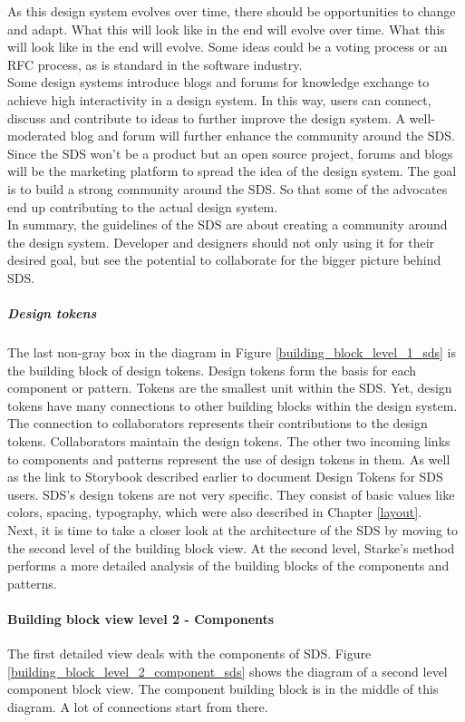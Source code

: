 As this design system evolves over time, there should be opportunities to change and adapt. What this will look like in the end will evolve over time. What this will look like in the end will evolve. Some ideas could be a voting process or an RFC process, as is standard in the software industry. \\
Some design systems introduce blogs and forums for knowledge exchange to achieve high interactivity in a design system. In this way, users can connect, discuss and contribute to ideas to further improve the design system. A well-moderated blog and forum will further enhance the community around the \ac{SDS}. \\
Since the \ac{SDS} won't be a product but an open source project, forums and blogs will be the marketing platform to spread the idea of the design system. The goal is to build a strong community around the \ac{SDS}. So that some of the advocates end up contributing to the actual design system. \\
In summary, the guidelines of the \acl{SDS} are about creating a community around the design system. Developer and designers should not only using it for their desired goal, but see the potential to collaborate for the bigger picture behind \ac{SDS}.

\subparagraph{Design tokens}
The last non-gray box in the diagram in Figure \ref{building_block_level_1_sds} is the building block of design tokens. Design tokens form the basis for each component or pattern. Tokens are the smallest unit within the \ac{SDS}. Yet, design tokens have many connections to other building blocks within the design system. 
The connection to collaborators represents their contributions to the design tokens. Collaborators maintain the design tokens. The other two incoming links to components and patterns represent the use of design tokens in them. As well as the link to Storybook described earlier to document Design Tokens for \ac{SDS} users.
\ac{SDS}'s design tokens are not very specific. They consist of basic values like colors, spacing, typography, which were also described in Chapter \ref{layout}.\\

Next, it is time to take a closer look at the architecture of the SDS by moving to the second level of the building block view. At the second level, Starke's method performs a more detailed analysis of the building blocks of the components and patterns.

\paragraph{Building block view level 2 - Components}
The first detailed view deals with the components of SDS. Figure \ref{building_block_level_2_component_sds} shows the diagram of a second level component block view. The component building block is in the middle of this diagram. A lot of connections start from there.

